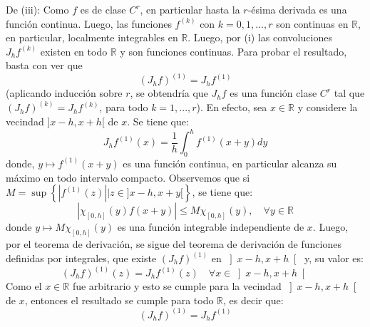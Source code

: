 \documentclass[12pt]{report}
\theoremstyle{largebreak}
\newcommand\abs[1]{\ensuremath{\left|#1\right|}}
\begin{document}
\begin{sol}
        De (iii): Como $f$ es de clase $C^r$, en particular hasta la $r$-ésima derivada es una función continua. Luego, las funciones $f^{(k)}$ con $k=0,1,...,r$ son continuas en $\mathbb{R}$, en particular, localmente integrables en $\mathbb{R}$. Luego, por (i) las convoluciones $J_hf^{(k)}$ existen en todo $\mathbb{R}$ y son funciones continuas. Para probar el resultado, basta con ver que
        \begin{equation*}
            (J_hf)^{(1)}=J_hf^{(1)}
        \end{equation*}
        (aplicando inducción sobre $r$, se obtendría que $J_hf$ es una función clase $C^r$ tal que $\left(J_hf\right)^{(k)}=J_hf^{(k)}$, para todo $k=1,...,r$). En efecto, sea $x\in\mathbb{R}$ y considere la vecindad $]x-h,x+h[$ de $x$. Se tiene que:
        \begin{equation*}
            J_hf^{(1)}(x)=\frac{1}{h}\int_0^hf^{(1)}(x+y)dy
        \end{equation*}
        donde, $y\mapsto f^{(1)}(x+y)$ es una función continua, en particular alcanza su máximo en todo intervalo compacto. Observemos que si $M=\sup\left\{\abs{f^{(1)}(z)}\Big|z\in ]x-h,x+y[ \right\} $, se tiene que:
        \begin{equation*}
            \abs{\chi_{ [0,h]}(y)f(x+y)}\leq M\chi_{[0,h]}(y),\quad\forall y\in\mathbb{R}
        \end{equation*}
        donde $y\mapsto M\chi_{[0,h]}(y)$ es una función integrable independiente de $x$. Luego, por el teorema de derivación, se sigue del teorema de derivación de funciones definidas por integrales, que existe $(J_hf)^{(1)}$ en $\left]x-h,x+h\right[$ y, su valor es:
        \begin{equation*}
            (J_hf)^{(1)}(z)=J_hf^{(1)}(z)\quad\forall x\in\left]x-h,x+h\right[
        \end{equation*}
        Como el $x\in\mathbb{R}$ fue arbitrario y esto se cumple para la vecindad $\left]x-h,x+h\right[$ de $x$, entonces el resultado se cumple para todo $\mathbb{R}$, es decir que:
        \begin{equation*}
            (J_hf)^{(1)}=J_hf^{(1)}
        \end{equation*}
    \end{sol}
\end{document}

